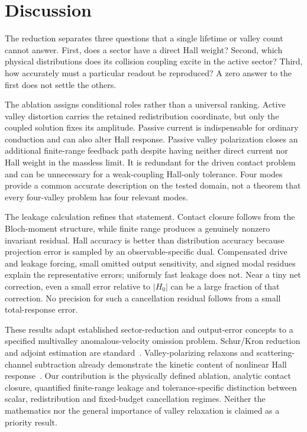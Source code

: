 \section{Discussion}
The reduction separates three questions that a single lifetime or valley count cannot answer. First, does a sector have a direct Hall weight? Second, which physical distributions does its collision coupling excite in the active sector? Third, how accurately must a particular readout be reproduced? A zero answer to the first does not settle the others.

The ablation assigns conditional roles rather than a universal ranking. Active valley distortion carries the retained redistribution coordinate, but only the coupled solution fixes its amplitude. Passive current is indispensable for ordinary conduction and can also alter Hall response. Passive valley polarization closes an additional finite-range feedback path despite having neither direct current nor Hall weight in the massless limit. It is redundant for the driven contact problem and can be unnecessary for a weak-coupling Hall-only tolerance. Four modes provide a common accurate description on the tested domain, not a theorem that every four-valley problem has four relevant modes.

The leakage calculation refines that statement. Contact closure follows from the Bloch-moment structure, while finite range produces a genuinely nonzero invariant residual. Hall accuracy is better than distribution accuracy because projection error is sampled by an observable-specific dual. Compensated drive and leakage forcing, small omitted output sensitivity, and signed modal residues explain the representative errors; uniformly fast leakage does not. Near a tiny net correction, even a small error relative to $|H_0|$ can be a large fraction of that correction. No precision for such a cancellation residual follows from a small total-response error.

These results adapt established sector-reduction and output-error concepts to a specified multivalley anomalous-velocity omission problem. Schur/Kron reduction and adjoint estimation are standard~\cite{DorflerBullo2013,PierceGiles2004}. Valley-polarizing relaxons and scattering-channel subtraction already demonstrate the kinetic content of nonlinear Hall response~\cite{LihmPark2024}. Our contribution is the physically defined ablation, analytic contact closure, quantified finite-range leakage and tolerance-specific distinction between scalar, redistribution and fixed-budget cancellation regimes. Neither the mathematics nor the general importance of valley relaxation is claimed as a priority result.


